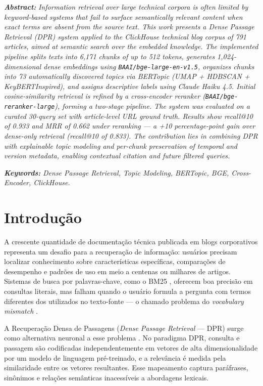 \documentclass[11pt,a4paper]{article}
\begin{document}
\vspace{1em}
\noindent \textit{\textbf{Abstract:}} \textit{Information retrieval over large technical corpora is often limited by keyword-based systems that fail to surface semantically relevant content when exact terms are absent from the source text. This work presents a Dense Passage Retrieval (DPR) system applied to the ClickHouse technical blog corpus of 791 articles, aimed at semantic search over the embedded knowledge. The implemented pipeline splits texts into 6{,}171 chunks of up to 512 tokens, generates 1{,}024-dimensional dense embeddings using \texttt{BAAI/bge-large-en-v1.5}, organizes chunks into 73 automatically discovered topics via BERTopic (UMAP + HDBSCAN + KeyBERTInspired), and assigns descriptive labels using Claude Haiku 4.5. Initial cosine-similarity retrieval is refined by a cross-encoder reranker (\texttt{BAAI/bge-reranker-large}), forming a two-stage pipeline. The system was evaluated on a curated 30-query set with article-level URL ground truth. Results show recall@10 of 0.933 and MRR of 0.662 under reranking --- a +10 percentage-point gain over dense-only retrieval (recall@10 of 0.833). The contribution lies in combining DPR with explainable topic modeling and per-chunk preservation of temporal and version metadata, enabling contextual citation and future filtered queries.}

\vspace{0.5em}
\noindent \textit{\textbf{Keywords:}} \textit{Dense Passage Retrieval, Topic Modeling, BERTopic, BGE, Cross-Encoder, ClickHouse.}

\section{Introdução}

A crescente quantidade de documentação técnica publicada em blogs corporativos representa um desafio para a recuperação de informação: usuários precisam localizar conhecimento sobre características específicas, comparações de desempenho e padrões de uso em meio a centenas ou milhares de artigos. Sistemas de busca por palavras-chave, como o BM25 \cite{robertson2009}, oferecem boa precisão em consultas literais, mas falham quando o usuário formula a pergunta com termos diferentes dos utilizados no texto-fonte --- o chamado problema do \textit{vocabulary mismatch} \cite{furnas1987}.

A Recuperação Densa de Passagens (\textit{Dense Passage Retrieval} --- DPR) surge como alternativa neuronal a esse problema \cite{karpukhin2020}. No paradigma DPR, consulta e passagem são codificadas independentemente em vetores de alta dimensionalidade por um modelo de linguagem pré-treinado, e a relevância é medida pela similaridade entre os vetores resultantes. Esse mapeamento captura paráfrases, sinônimos e relações semânticas inacessíveis a abordagens lexicais.
\end{document}

